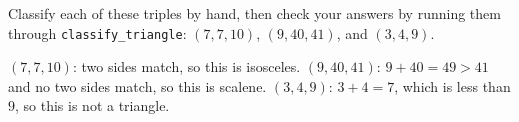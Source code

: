 \begin{Exercise}[title={Classifying Triangles}, label=classify_triangle_sides]
Classify each of these triples by hand, then check your answers by running them through \texttt{classify_triangle}: $(7, 7, 10)$, $(9, 40, 41)$, and $(3, 4, 9)$.
\end{Exercise}
\begin{Answer}[ref=classify_triangle_sides]
$(7, 7, 10)$: two sides match, so this is isosceles. $(9, 40, 41)$: $9 + 40 = 49 > 41$ and no two sides match, so this is scalene. $(3, 4, 9)$: $3 + 4 = 7$, which is less than $9$, so this is not a triangle.
\end{Answer}

